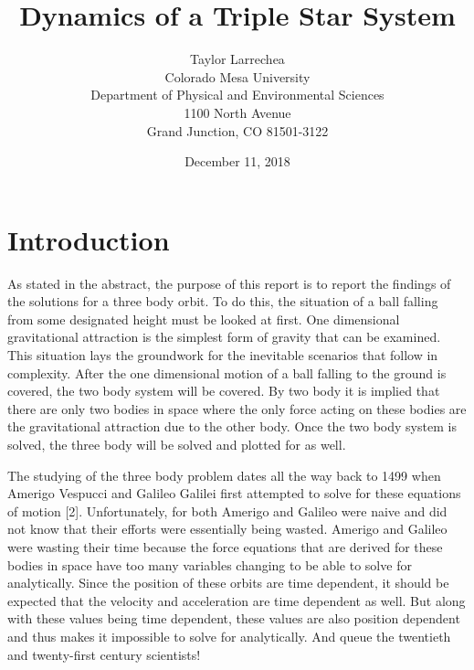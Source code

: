 \documentclass[twocolumn]{article}
\title{\textbf{Dynamics of a Triple Star System}}
\author{Taylor Larrechea \\ Colorado Mesa University \\
    Department of Physical and Environmental Sciences \\
    1100 North Avenue \\
    Grand Junction, CO 81501-3122
}
\date{December 11, 2018}
\begin{document}
\section{Introduction}
\indent As stated in the abstract, the purpose of this report is to report the findings of the solutions for a three body orbit. To do this, the situation of a ball falling from some designated height must be looked at first. One dimensional gravitational attraction is the simplest form of gravity that can be examined. This situation lays the groundwork for the inevitable scenarios that follow in complexity. After the one dimensional motion of a ball falling to the ground is covered, the two body system will be covered. By two body it is implied that there are only two bodies in space where the only force acting on these bodies are the gravitational attraction due to the other body. Once the two body system is solved, the three body will be solved and plotted for as well.

The studying of the three body problem dates all the way back to 1499 when Amerigo Vespucci and Galileo Galilei first attempted to solve for these equations of motion [2]. Unfortunately, for both Amerigo and Galileo were naive and did not know that their efforts were essentially being wasted. Amerigo and Galileo were wasting their time because the force equations that are derived for these bodies in space have too many variables changing to be able to solve for analytically. Since the position of these orbits are time dependent, it should be expected that the velocity and acceleration are time dependent as well. But along with these values being time dependent, these values are also position dependent and thus makes it impossible to solve for analytically. And queue the twentieth and twenty-first century scientists!
\end{document}
